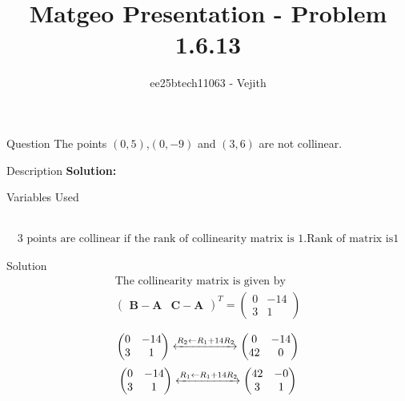 \documentclass{beamer}
\title{Matgeo Presentation - Problem 1.6.13}
\author{ee25btech11063 - Vejith}
\numberwithin{equation}{section}
\providecommand{\brak}[1]{\ensuremath{\left(#1\right)}}
\theoremstyle{remark}
\newcommand{\myvec}[1]{\ensuremath{\begin{pmatrix}#1\end{pmatrix}}}
\let\vec\mathbf
\begin{document}
\frame{\titlepage}
\begin{frame}{Question}
The points $\brak{0,5}$,$\brak{0,-9}$ and $\brak{3,6}$ are  not collinear.
\end{frame}

\begin{frame}{Description}
\textbf{Solution: }\\
\begin{table}[h!]    
  \centering
  
  \caption{Variables Used}
  \label{}
\end{table}\\
\begin{align}
\text{3 points are collinear if the rank of collinearity matrix is 1.Rank of matrix is1}
\end{align}
\end{frame}

\begin{frame}{Solution}
    \begin{align}
\text{The collinearity matrix is given by}\\
\myvec{
   \vec{B}-\vec{A} & \vec{C}-\vec{A}
 }^T = \myvec{
   0 & -14 
   \\
   3 & 1
   }\\
\end{align}
\begin{align}
    \myvec{
   0 & -14 
   \\
   3 & 1
   }
   \xleftrightarrow[]{R_2 \leftarrow {R_1+14R_2}}
   \myvec{
   0 & -14
   \\
   42 & 0
   }\\
 \end{align}
 \begin{align}
     \myvec{
   0 & -14
   \\
   3 & 1
   }
   \xleftrightarrow[]{R_1 \leftarrow {R_1+14R_2}}
   \myvec{
   42 & -0
   \\
   3 & 1
   }
\end{align}
\end{frame}
\end{document}

